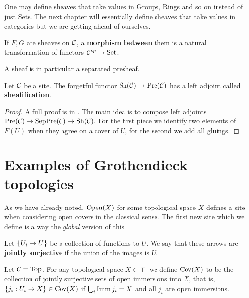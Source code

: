 \begin{remark}
One may define sheaves that take values in Groups, Rings and so on instead of just Sets. The next chapter will essentially define sheaves that take values in categories but we are getting ahead of ourselves.
\end{remark}

\begin{definition}[]
If $F,G$ are sheaves on $\mathcal{C}$, a \textbf{morphism between} them is a natural transformation of functors $\mathcal{C}^{op}\to \mathrm{Set}$.
\end{definition}

\begin{remark}
A sheaf is in particular a separated presheaf.
\end{remark}

\begin{theorem}
Let $\mathcal{C}$ be a site. The forgetful functor $\mathrm{Sh}(\mathcal{C})\to \mathrm{Pre}(\mathcal{C})$ has a left adjoint called \textbf{sheafification}.
\end{theorem}
\begin{proof}
A full proof is in \cite{olsson2016algebraic}. The main idea is to compose left adjoints $\mathrm{Pre}(\mathcal{C})\to \mathrm{Sep}\mathrm{Pre}(\mathcal{C})\to \mathrm{Sh}(\mathcal{C})$. For the first piece we identify two elements of $F(U)$ when they agree on a cover of $U$, for the second we add all gluings.
\end{proof}



\section{Examples of Grothendieck topologies}
As we have already noted, $\operatorname{Open}(X)$ for some topological space $X$ defines a site when considering open covers in the classical sense. The first new site which we define is a way the \textit{global} version of this

\begin{definition}[]
Let $\left\{{U_i\to U}\right\}$ be a collection of functions to $U$. We say that these arrows are \textbf{jointly surjective} if the union of the images is $U$.
\end{definition}

\begin{example}
Let $\mathcal{C}=\mathrm{Top}$. For any topological space $X\in \Top$ we define $\operatorname{Cov}(X)$ to be the collection of jointly surjective sets of open immersions into $X$, that is, $\left\{{j_i:U_i\to X}\right\}\in \operatorname{Cov}(X)$ if $\bigcup_{i}\operatorname{Imm} j_i=X$ and all $j_i$ are open immersions.
\end{example}

